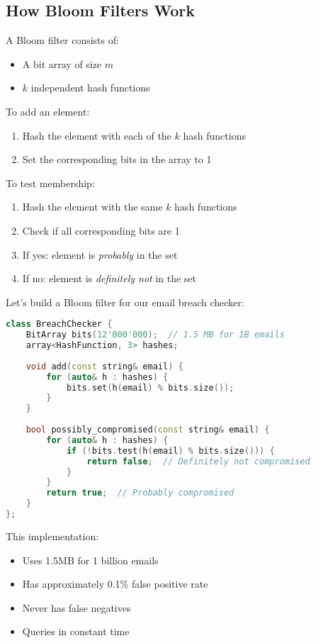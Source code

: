 \subsection{How Bloom Filters Work}

A Bloom filter consists of:
\begin{itemize}
    \item A bit array of size $m$
    \item $k$ independent hash functions
\end{itemize}

To add an element:
\begin{enumerate}
    \item Hash the element with each of the $k$ hash functions
    \item Set the corresponding bits in the array to 1
\end{enumerate}

To test membership:
\begin{enumerate}
    \item Hash the element with the same $k$ hash functions
    \item Check if all corresponding bits are 1
    \item If yes: element is \emph{probably} in the set
    \item If no: element is \emph{definitely not} in the set
\end{enumerate}

\begin{example}
Let's build a Bloom filter for our email breach checker:

\begin{lstlisting}[language=C++]
class BreachChecker {
    BitArray bits(12'000'000);  // 1.5 MB for 1B emails
    array<HashFunction, 3> hashes;
    
    void add(const string& email) {
        for (auto& h : hashes) {
            bits.set(h(email) % bits.size());
        }
    }
    
    bool possibly_compromised(const string& email) {
        for (auto& h : hashes) {
            if (!bits.test(h(email) % bits.size())) {
                return false;  // Definitely not compromised
            }
        }
        return true;  // Probably compromised
    }
};
\end{lstlisting}

This implementation:
\begin{itemize}
    \item Uses 1.5MB for 1 billion emails
    \item Has approximately 0.1\% false positive rate
    \item Never has false negatives
    \item Queries in constant time
\end{itemize}
\end{example}

